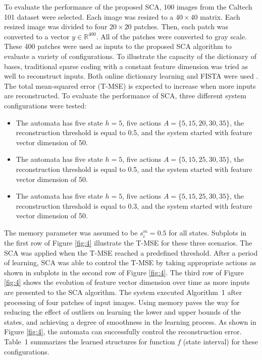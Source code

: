 \documentclass[journal]{IEEEtran}
\begin{document}
To evaluate the performance of the proposed SCA, 100 images from the Caltech 101 dataset were selected. Each image was resized to a $40 \times 40$ matrix. Each resized image was divided to four $20 \times 20$ patches. Then, each patch was converted to a vector $y \in  \mathbb{R}^{400}$. All of the patches were converted to gray scale. These 400 patches were used as inputs to the proposed SCA algorithm to evaluate a variety of configurations. To illustrate the capacity of the dictionary of bases, traditional sparse coding with a constant feature dimension was tried as well to reconstruct inputs. Both online dictionary learning and FISTA were used \cite{Mairal2009, Beck2009}. The total mean-squared error (T-MSE) is expected to increase when more inputs are reconstructed. To evaluate the performance of SCA, three different system configurations were tested: 
\begin{itemize}
\item The automata has five state $h=5$, five actions $A=\{5,15,20,30,35\}$, the reconstruction threshold is equal to 0.5, and the system started with feature vector dimension of 50. 
\item The automata has five state $h=5$, five actions $A=\{5,15,25,30,35\}$, the reconstruction threshold is equal to 0.5, and the system started with feature vector dimension of 50. 
\item The automata has five state $h=5$, five actions $A=\{5,15,25,30,35\}$, the reconstruction threshold is equal to 0.3, and the system started with feature vector dimension of 50. 
\end{itemize}
The memory parameter was assumed to be $s_i^m=0.5$ for all states. Subplots in the first row of Figure \ref{fig:4} illustrate the T-MSE for these three scenarios. The SCA was applied when the T-MSE reached a predefined threshold. After a period of learning, SCA was able to control the T-MSE by taking appropriate actions as shown in subplots in the second row of Figure \ref{fig:4}. The third row of Figure \ref{fig:4} shows the evolution of feature vector dimension over time as more inputs are presented to the SCA algorithm. The system executed Algorithm~1 after processing of four patches of input images. Using memory paves the way for reducing the effect of outliers on learning the lower and upper bounds of the states, and achieving a degree of smoothness in the learning process. As shown in Figure \ref{fig:4}, the automata can successfully control the reconstruction error. Table~1 summarizes the learned structures for function $f$ (state interval) for these configurations.
\end{document}
